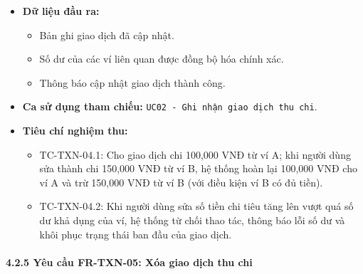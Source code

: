 \documentclass[11pt,a4paper]{article}
\providecommand{\tightlist}{
  \setlength{\itemsep}{0pt}\setlength{\parskip}{0pt}}
\begin{document}
\begin{itemize}
\begin{itemize}
    \begin{itemize}
    \tightlist
    \item
      Nếu là \texttt{Income}: Cộng số tiền mới vào ví mới.
    \item
      Nếu là \texttt{Expense}: Trừ số tiền mới khỏi ví mới.
    \end{itemize}
  \item
    Cập nhật thông tin bản ghi giao dịch trong cơ sở dữ liệu trong cùng
    một khối giao dịch nguyên tử.
  \end{itemize}
\item
  \textbf{Dữ liệu đầu ra:}

  \begin{itemize}
  \tightlist
  \item
    Bản ghi giao dịch đã cập nhật.
  \item
    Số dư của các ví liên quan được đồng bộ hóa chính xác.
  \item
    Thông báo cập nhật giao dịch thành công.
  \end{itemize}
\item
  \textbf{Ca sử dụng tham chiếu:}
  \texttt{UC02\ -\ Ghi\ nhận\ giao\ dịch\ thu\ chi}.
\item
  \textbf{Tiêu chí nghiệm thu:}

  \begin{itemize}
  \tightlist
  \item
    TC-TXN-04.1: Cho giao dịch chi 100,000 VNĐ từ ví A; khi người dùng
    sửa thành chi 150,000 VNĐ từ ví B, hệ thống hoàn lại 100,000 VNĐ cho
    ví A và trừ 150,000 VNĐ từ ví B (với điều kiện ví B có đủ tiền).
  \item
    TC-TXN-04.2: Khi người dùng sửa số tiền chi tiêu tăng lên vượt quá
    số dư khả dụng của ví, hệ thống từ chối thao tác, thông báo lỗi số
    dư và khôi phục trạng thái ban đầu của giao dịch.
  \end{itemize}
\end{itemize}

\newpage

\paragraph{4.2.5 Yêu cầu FR-TXN-05: Xóa giao dịch thu
chi}\label{425-yuxeau-cux1ea7u-fr-txn-05-xuxf3a-giao-dux1ecbch-thu-chi}
\end{document}
